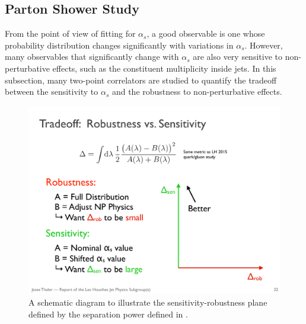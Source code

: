 \subsection{Parton Shower Study}


From the point of view of fitting for $\alpha_s$, a good observable is one whose probability distribution changes significantly with variations in $\alpha_s$.
%
However, many observables that significantly change with $\alpha_s$ are also very sensitive to non-perturbative effects, such as the constituent multiplicity inside jets.
%
In this subsection, many two-point correlators are studied to quantify the tradeoff between the sensitivity to $\alpha_s$ and the robustness to non-perturbative effects.

\begin{figure}[t]
\begin{center}
\includegraphics[width = 0.4\columnwidth]{figures/robustnessschematic.pdf}
\end{center}
\caption{A schematic diagram to illustrate the sensitivity-robustness plane defined by the separation power defined in .}
\label{fig:robustnessschematic}
\end{figure}

